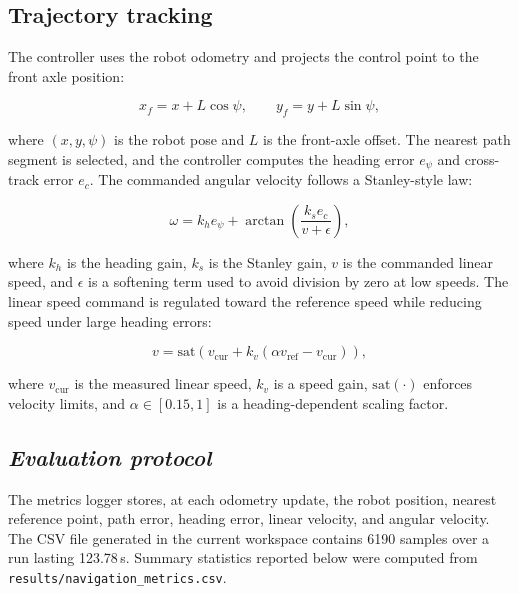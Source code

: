\documentclass[12pt,a4paper]{cibb}
\begin{document}
\subsection{Trajectory tracking}

The controller uses the robot odometry and projects the control point to the front axle position:

\begin{equation}
x_f = x + L \cos \psi, \qquad y_f = y + L \sin \psi,
\label{eq:front_axle}
\end{equation}

where $(x, y, \psi)$ is the robot pose and $L$ is the front-axle offset. The nearest path segment is selected, and the controller computes the heading error $e_\psi$ and cross-track error $e_c$. The commanded angular velocity follows a Stanley-style law:

\begin{equation}
\omega = k_h e_\psi + \arctan\left(\frac{k_s e_c}{v + \epsilon}\right),
\label{eq:stanley_like}
\end{equation}

where $k_h$ is the heading gain, $k_s$ is the Stanley gain, $v$ is the commanded linear speed, and $\epsilon$ is a softening term used to avoid division by zero at low speeds. The linear speed command is regulated toward the reference speed while reducing speed under large heading errors:

\begin{equation}
v = \mathrm{sat}\left(v_{\mathrm{cur}} + k_v \left(\alpha v_{\mathrm{ref}} - v_{\mathrm{cur}}\right)\right),
\label{eq:speed_command}
\end{equation}

where $v_{\mathrm{cur}}$ is the measured linear speed, $k_v$ is a speed gain, $\mathrm{sat}(\cdot)$ enforces velocity limits, and $\alpha \in [0.15, 1]$ is a heading-dependent scaling factor.

\subsection{\bf \it Evaluation protocol}
\label{sec:TABLES-AND-FIGURES}

The metrics logger stores, at each odometry update, the robot position, nearest reference point, path error, heading error, linear velocity, and angular velocity. The CSV file generated in the current workspace contains 6190 samples over a run lasting 123.78\,s. Summary statistics reported below were computed from \texttt{results/navigation\_metrics.csv}.
\end{document}

